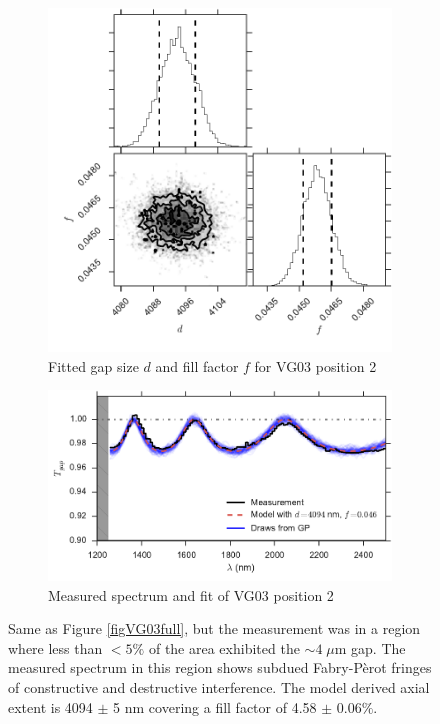 \documentclass[osajnl,preprint,showpacs,superscriptaddress,12pt]{revtex4-1} %
\begin{document}
\begin{figure}[htbp]
        \centering
        \begin{subfigure}[b]{0.5\textwidth}
              \includegraphics[width=\textwidth]{figs/VG03p2_corner.pdf}
              \caption{Fitted gap size $d$ and fill factor $f$ for VG03 position 2}
		\label{figVG03p2_corner}
        \end{subfigure}
	
        \begin{subfigure}[b]{0.5\textwidth}
                \includegraphics[width=\textwidth]{figs/VG03_f045.pdf}
                \caption{Measured spectrum and fit of VG03 position 2}
                \label{figVG03_f045}
        \end{subfigure}
\caption{ Same as Figure \ref{figVG03full}, but the measurement was in a region where less than $<5\%$ of the area exhibited the $\sim4\; \mu$m gap.  The measured spectrum in this region shows subdued Fabry-P\`erot fringes of constructive and destructive interference. The model derived axial extent is 4094 $\pm$ 5 nm covering a fill factor of 4.58 $\pm$ 0.06$\%$. \label{figVG03part}}
\end{figure}
\end{document}
